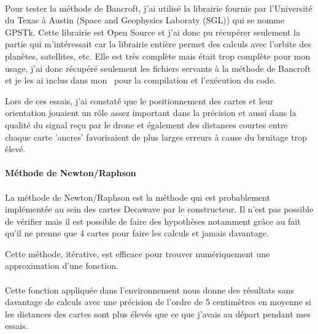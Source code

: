             \paragraph*{}
            Pour tester la méthode de Bancroft, j'ai utilisé la librairie fournie par l'Université du Texas à Austin (Space and Geophysics Laboraty (SGL)) qui se nomme GPSTk\cite{gpstk}. Cette librairie est Open Source et j'ai donc pu récupérer seulement la partie qui m'intéressait car la librairie entière permet des calculs avec l'orbite des planètes, satellites, etc. Elle est très complète mais était trop complète pour mon usage, j'ai donc récupéré seulement les fichiers servants à la méthode de Bancroft et je les ai inclus dans mon \rpi ~pour la compilation et l'exécution du code.
            
            Lors de ces essais, j'ai constaté que le positionnement des cartes et leur orientation jouaient un rôle assez important dans la précision et aussi dans la qualité du signal reçu par le drone et également des distances courtes entre chaque carte 'ancres' favorisaient de plus larges erreurs à cause du bruitage trop élevé.
        
        
        \paragraph{Méthode de Newton/Raphson}
            \paragraph*{}
            La méthode de Newton/Raphson est la méthode qui est probablement implémentée au sein des cartes Decawave par le constructeur. Il n'est pas possible de vérifier mais il est possible de faire des hypothèses notamment grâce au fait qu'il ne prenne que 4 cartes pour faire les calculs et jamais davantage.
            
            Cette méthode, itérative, est efficace pour trouver numériquement une approximation d'une fonction.
            
            \paragraph*{}
            Cette fonction appliquée dans l'environnement nous donne des résultats sans davantage de calculs avec une précision de l'ordre de 5 centimètres en moyenne si les distances des cartes sont plus élevés que ce que j'avais au départ pendant mes essais.
            
